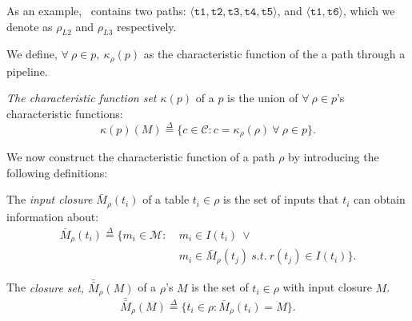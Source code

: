 As an example, \exampledp\ contains two paths: $\langle \texttt{t1}, \texttt{t2}, \texttt{t3}, \texttt{t4}, \texttt{t5} \rangle$, and $\langle \texttt{t1}, \texttt{t6} \rangle$, which we denote as $\rho_{L2}$ and $\rho_{L3}$ respectively. 

We define, $\forall\ \rho \in p,\ \kappa_\rho(p)$ as the characteristic function of the a path through a pipeline. 

\begin{definition} {\em The characteristic function set $\kappa(p)$} of a $p$ is the union of $\forall\ \rho \in p$'s characteristic functions:
\begin{equation*}
\kappa(p)(M) \overset{\Delta}{=} \{c \in \mathcal{C} : c = \kappa_\rho(\rho)\ \forall\ \rho \in p\}.
\end{equation*}
\end{definition}

We now construct the characteristic function of a path $\rho$ by introducing the following definitions:




\begin{definition} The {\em input closure $\bar{M}_\rho(t_i)$} of a table $t_i \in \rho$ is the set of inputs that $t_i$ can obtain information about:
\begin{equation*}
\begin{split}
\bar{M}_\rho(t_i) \overset{\Delta}{=} \{m_i \in \mathcal{M} :\ &m_i \in I(t_i)\ \vee\\ &m_i \in \bar{M}_\rho(t_j)\ s.t.\ r(t_j) \in I(t_i)\}.
\end{split}
\end{equation*}
\end{definition}

\begin{definition} The {\em closure set, $\bar{\bar{M}}_\rho(M)$} of a $\rho$'s $M$ is the set of $t_i \in \rho$ with input closure $M$.
\begin{equation*}
\bar{\bar{M}}_\rho(M) \overset{\Delta}{=} \{t_i \in \rho : \bar{M}_\rho(t_i) = M\}. 
\end{equation*}
\end{definition}

